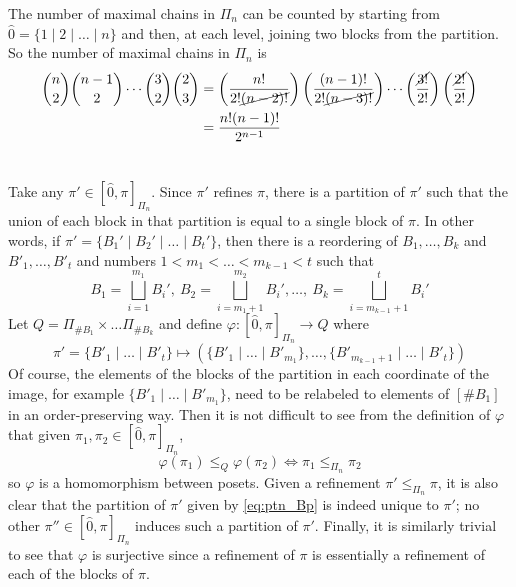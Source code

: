 \documentclass[12pt]{article}
\begin{document}
The number of maximal chains in $\Pi_n$ can be counted by starting from $\hat{0} = \{1 \mid 2 \mid \ldots \mid n\}$ and then, at each level, joining two blocks from the partition.  
So the number of maximal chains in $\Pi_n$ is 
\begin{align*}
  \binom{n}{2} \binom{n - 1}{2} \cdots \binom{3}{2} \binom{2}{3}  
  & = \left( \frac{n!}{2! \cancel{(n - 2)!}} \right) \left( \frac{(n - 1)!}{2! \cancel{(n - 3)!}} \right) \cdots \left( \frac{\cancel{3!}}{2!} \right) \left( \frac{\cancel{2!}}{2!} \right) \\ 
  & = \frac{n! (n - 1)!}{2^{n - 1}}
\end{align*}

\section{}
Take any $\pi' \in [\hat{0}, \pi]_{\Pi_n}$. 
Since $\pi'$ refines $\pi$, there is a partition of $\pi'$ such that the union of each block in that partition is equal to a single block of $\pi$. 
In other words, if $\pi' = \{B_{1}' \mid B_{2}' \mid \ldots \mid B_{t}'\}$, then there is a reordering of $B_1, \ldots, B_k$ and $B'_{1}, \ldots, B'_{t}$ and numbers $1 < m_1 <  \ldots < m_{k - 1} < t$ such that 
$$B_1 = \bigsqcup_{i = 1}^{m_1} B_{i}', \: B_2 = \bigsqcup_{i = m_{1} + 1}^{m_2} B_{i}', \ldots, \:  B_k = \bigsqcup_{i = m_{k - 1} + 1}^{t} B_{i}' $$
Let $Q = \Pi_{\#B_1} \times \ldots \Pi_{\#B_{k}}$ and define $\varphi: [\hat{0}, \pi]_{\Pi_n} \rightarrow Q$ where 
\begin{equation} \label{eq:ptn_Bp}
  \pi' = \{B'_{1} \mid \ldots \mid B'_{t}\} \mapsto (\{B'_{1} \mid \ldots \mid B'_{m_1}\}, \ldots, \{B'_{m_{k - 1} + 1} \mid \ldots \mid B'_{t}\})
\end{equation}
Of course, the elements of the blocks of the partition in each coordinate of the image, for example $\{B'_{1} \mid \ldots \mid B'_{m_1} \}$, need to be relabeled to elements of $[\#B_1]$ in an order-preserving way. 
Then it is not difficult to see from the definition of $\varphi$ that given $\pi_1, \pi_2 \in [\hat{0}, \pi]_{\Pi_n}$, 
$$\varphi(\pi_1) \leq_{Q} \varphi(\pi_2) \iff \pi_1 \leq_{\Pi_n} \pi_2$$
so $\varphi$ is a homomorphism between posets. 
Given a refinement $\pi' \leq_{\Pi_n} \pi$, it is also clear that the partition of $\pi'$ given by \eqref{eq:ptn_Bp} is indeed unique to $\pi'$; 
no other $\pi'' \in [\hat{0}, \pi]_{\Pi_n}$ induces such a partition of $\pi'$. 
Finally, it is similarly trivial to see that $\varphi$ is surjective since a refinement of $\pi$ is essentially a refinement of each of the blocks of $\pi$. 
\end{document}
